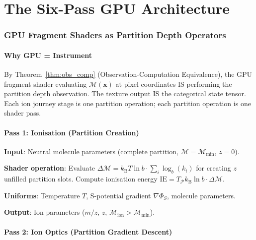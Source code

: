 \documentclass[11pt,twocolumn,a4paper]{article}
\theoremstyle{definition}
\theoremstyle{remark}
\newcommand{\kB}{k_{\mathrm{B}}}
\newcommand{\Depth}{\mathcal{M}}
\newcommand{\Spotential}{\Phi_S}
\begin{document}

\part{The Six-Pass GPU Architecture}

\section{GPU Fragment Shaders as Partition Depth Operators}
\label{sec:six_pass}

\subsection{Why GPU = Instrument}

By Theorem~\ref{thm:obs_comp} (Observation-Computation Equivalence), the GPU fragment shader evaluating $\Depth(\mathbf{x})$ at pixel coordinates IS performing the partition depth observation. The texture output IS the categorical state tensor. Each ion journey stage is one partition operation; each partition operation is one shader pass.

\subsection{Pass 1: Ionisation (Partition Creation)}

\textbf{Input}: Neutral molecule parameters (complete partition, $\Depth = \Depth_{\min}$, $z = 0$).

\textbf{Shader operation}: Evaluate $\Delta\Depth = \kB T \ln b \cdot \sum_i \log_b(k_i)$ for creating $z$ unfilled partition slots. Compute ionisation energy $\mathrm{IE} = T_{\mathcal{P}}\kB\ln b \cdot \Delta\Depth$.

\textbf{Uniforms}: Temperature $T$, S-potential gradient $\nabla\Spotential$, molecule parameters.

\textbf{Output}: Ion parameters ($m/z$, $z$, $\Depth_{\mathrm{ion}} > \Depth_{\min}$).

\subsection{Pass 2: Ion Optics (Partition Gradient Descent)}
\end{document}

